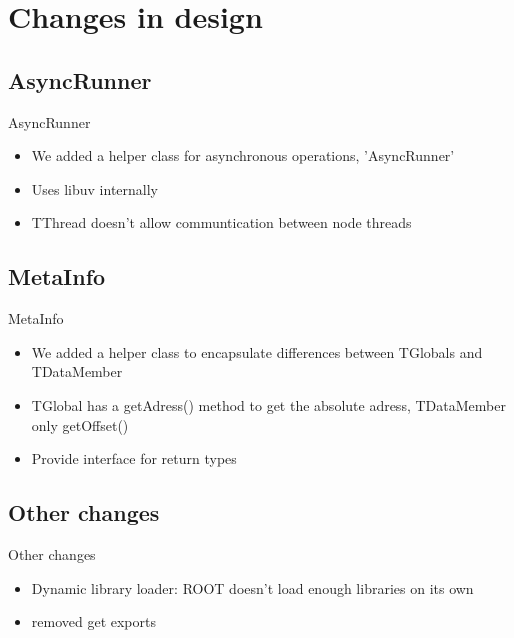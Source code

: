 \section{Changes in design}

\subsection{AsyncRunner}
\begin{frame}{AsyncRunner}
	\begin{itemize}
		\item We added a helper class for asynchronous operations, 'AsyncRunner'
		\item Uses libuv internally
		\item TThread doesn't allow communtication between node threads
	\end{itemize}
\end{frame}

\subsection{MetaInfo}
\begin{frame}{MetaInfo}
	\begin{itemize}
		\item We added a helper class to encapsulate differences between TGlobals and TDataMember
		\item TGlobal has a getAdress() method to get the absolute adress, TDataMember only getOffset()
		\item Provide interface for return types
	\end{itemize}
\end{frame}

\subsection{Other changes}
\begin{frame}{Other changes}
	\begin{itemize}
		\item Dynamic library loader: ROOT doesn't load enough libraries on its own
		\item removed get exports
	\end{itemize}
\end{frame}
